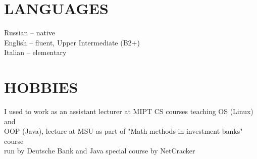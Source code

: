 \documentclass[margin,12pt]{res}
\begin{document}
\begin{resume}
\section{LANGUAGES}
Russian -- native\\
English -- fluent, Upper Intermediate (B2+)\\
Italian -- elementary

\section{HOBBIES}
I used to work as an assistant lecturer at MIPT CS courses teaching OS (Linux) and\\
 OOP (Java), lecture at MSU as part of "Math methods in investment banks" course\\
run by Deutsche Bank and Java special course by NetCracker

\end{resume}
\end{document}
